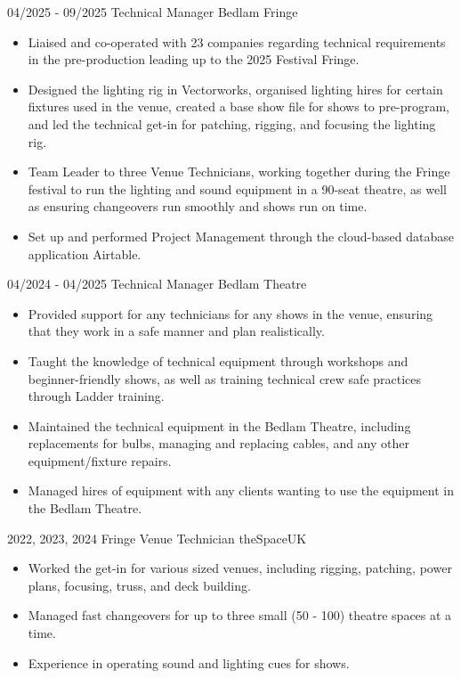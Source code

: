 \documentclass[../../cv-tech.tex]{subfiles}
\begin{document}
\cvevent
{04/2025 - 09/2025}
	{Technical Manager}
	{Bedlam Fringe}
	{\begin{itemize}
	    \item Liaised and co-operated with 23 companies regarding technical requirements in the pre-production leading up to the 2025 Festival Fringe.
		\item Designed the lighting rig in Vectorworks, organised lighting hires for certain fixtures used in the venue, created a base show file for shows to pre-program, and led the technical get-in for patching, rigging, and focusing the lighting rig.
		\item Team Leader to three Venue Technicians, working together during the Fringe festival to run the lighting and sound equipment in a 90-seat theatre, as well as ensuring changeovers run smoothly and shows run on time.
		\item Set up and performed Project Management through the cloud-based database application Airtable.
	\end{itemize}
}
\vfill\null

\cvevent
{04/2024 - 04/2025}
	{Technical Manager}
	{Bedlam Theatre}
	{\begin{itemize}
			\item Provided support for any technicians for any shows in the venue, ensuring that they work in a safe manner and plan realistically. 
			\item Taught the knowledge of technical equipment through workshops and beginner-friendly shows, as well as training technical crew safe practices through Ladder training. 
			\item Maintained the technical equipment in the Bedlam Theatre, including replacements for bulbs, managing and replacing cables, and any other equipment/fixture repairs. 
			\item Managed hires of equipment with any clients wanting to use the equipment in the Bedlam Theatre. 
	\end{itemize}
}
\vfill\null

\cvevent
{2022, 2023, 2024}
	{Fringe Venue Technician}
	{theSpaceUK}
	{\begin{itemize}
			\item Worked the get-in for various sized venues, including rigging, patching, power plans, focusing, truss, and deck building. 
			\item Managed fast changeovers for up to three small (50 - 100) theatre spaces at a time. 
			\item Experience in operating sound and lighting cues for shows. 
	\end{itemize}
}
\vfill\null
\end{document}
